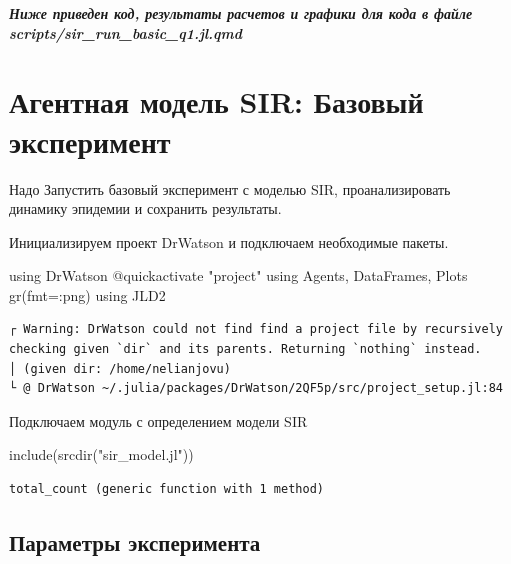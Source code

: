\documentclass[
  12pt,
  a4paper,
  DIV=11,
  numbers=noendperiod]{scrreprt}
\newenvironment{Shaded}{\begin{snugshade}}{\end{snugshade}}
\newcommand{\BuiltInTok}[1]{\textcolor[rgb]{0.00,0.23,0.31}{#1}}
\newcommand{\FunctionTok}[1]{\textcolor[rgb]{0.28,0.35,0.67}{#1}}
\newcommand{\ImportTok}[1]{\textcolor[rgb]{0.00,0.46,0.62}{#1}}
\newcommand{\NormalTok}[1]{\textcolor[rgb]{0.00,0.23,0.31}{#1}}
\newcommand{\OperatorTok}[1]{\textcolor[rgb]{0.37,0.37,0.37}{#1}}
\newcommand{\PreprocessorTok}[1]{\textcolor[rgb]{0.68,0.00,0.00}{#1}}
\newcommand{\StringTok}[1]{\textcolor[rgb]{0.13,0.47,0.30}{#1}}
\begin{document}
\textbf{\emph{Ниже приведен код, результаты расчетов и графики для кода
в файле scripts/sir\_run\_basic\_q1.jl.qmd}}

\chapter{Агентная модель SIR: Базовый
эксперимент}\label{ux430ux433ux435ux43dux442ux43dux430ux44f-ux43cux43eux434ux435ux43bux44c-sir-ux431ux430ux437ux43eux432ux44bux439-ux44dux43aux441ux43fux435ux440ux438ux43cux435ux43dux442-1}

Надо Запустить базовый эксперимент с моделью SIR, проанализировать
динамику эпидемии и сохранить результаты.

Инициализируем проект DrWatson и подключаем необходимые пакеты.

\begin{Shaded}
\begin{Highlighting}[]
\ImportTok{using} \BuiltInTok{DrWatson}
\PreprocessorTok{@quickactivate} \StringTok{"project"}
\ImportTok{using} \BuiltInTok{Agents}\NormalTok{, }\BuiltInTok{DataFrames}\NormalTok{, }\BuiltInTok{Plots}
\FunctionTok{gr}\NormalTok{(fmt}\OperatorTok{=:}\NormalTok{png)}
\ImportTok{using} \BuiltInTok{JLD2}
\end{Highlighting}
\end{Shaded}

\begin{verbatim}
┌ Warning: DrWatson could not find find a project file by recursively checking given `dir` and its parents. Returning `nothing` instead.
│ (given dir: /home/nelianjovu)
└ @ DrWatson ~/.julia/packages/DrWatson/2QF5p/src/project_setup.jl:84
\end{verbatim}

Подключаем модуль с определением модели SIR

\begin{Shaded}
\begin{Highlighting}[]
\FunctionTok{include}\NormalTok{(}\FunctionTok{srcdir}\NormalTok{(}\StringTok{"sir\_model.jl"}\NormalTok{))}
\end{Highlighting}
\end{Shaded}

\begin{verbatim}
total_count (generic function with 1 method)
\end{verbatim}

\section{Параметры
эксперимента}\label{ux43fux430ux440ux430ux43cux435ux442ux440ux44b-ux44dux43aux441ux43fux435ux440ux438ux43cux435ux43dux442ux430-1}
\end{document}
